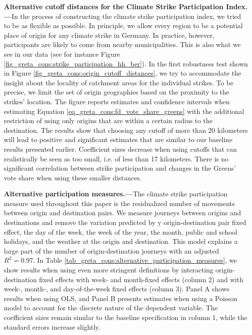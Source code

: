 \textbf{Alternative cutoff distances for the Climate Strike Participation Index.---}In the process of constructing the climate strike participation index, we tried to be as flexible as possible. In principle, we allow every region to be a potential place of origin for any climate strike in Germany. In practice, however, participants are likely to come from nearby municipalities. This is also what we see in our data (see for instance Figure \ref{fig_greta_cons:strike_participation_hh_ber}). In the first robustness test shown in Figure \ref{fig_greta_cons:origin_cutoff_distances}, we try to accommodate the insight about the locality of catchment areas for the individual strikes. To be precise, we limit the set of origin geographies based on the proximity to the strikes' location. The figure reports estimates and confidence intervals when estimating Equation \ref{eq_greta_cons:fd_vote_share_greens} with the additional restriction of using only origins that are within a certain radius to the destination. The results show that choosing any cutoff of more than 20 kilometers will lead to positive and significant estimates that are similar to our baseline results presented earlier. Coefficient sizes decrease when using cutoffs that can realistically be seen as too small, i.e. of less than 17 kilometers. There is no significant correlation between strike participation and changes in the Greens' vote share when using these smaller distances.


\textbf{Alternative participation measures.---}The climate strike participation measure used throughout this paper is the residualized number of movements between origin and destination pairs. We measure journeys between origins and destinations and remove the variation predicted by y origin-destination pair fixed effect, the day of the week, the week of the year, the month, public and school holidays, and the weather at the origin and destination. This model explains a large part of the number of origin-destination journeys with an adjusted $R^2 = 0.97$. In Table \ref{tab_greta_cons:alternative_participation_measures}, we show results when using even more stringent definitions by interacting origin-destination fixed effects with week- and month-fixed effects (column 2) and with week-, month-, and day-of-the-week fixed effects (column 3). Panel A shows results when using OLS, and Panel B presents estimates when using a Poisson model to account for the discrete nature of the dependent variable. The coefficient sizes remain similar to the baseline specification in column 1, while the standard errors increase slightly.


